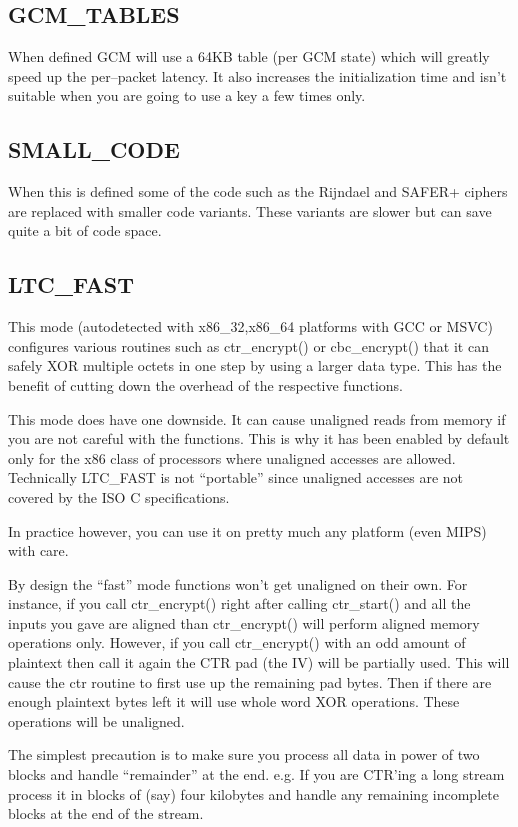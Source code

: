 \documentclass[a4paper]{book}
\begin{document}
\subsection{GCM\_TABLES}
When defined GCM will use a 64KB table (per GCM state) which will greatly speed up the per--packet latency.  
It also increases the initialization time and isn't suitable when you are going to use a key a few times only.  

\subsection{SMALL\_CODE}
When this is defined some of the code such as the Rijndael and SAFER+ ciphers are replaced with smaller code variants.
These variants are slower but can save quite a bit of code space.

\subsection{LTC\_FAST}
This mode (autodetected with x86\_32,x86\_64 platforms with GCC or MSVC) configures various routines such as ctr\_encrypt() or 
cbc\_encrypt() that it can safely XOR multiple octets in one step by using a larger data type.  This has the benefit of 
cutting down the overhead of the respective functions.  

This mode does have one downside.  It can cause unaligned reads from memory if you are not careful with the functions.  This is why
it has been enabled by default only for the x86 class of processors where unaligned accesses are allowed.  Technically LTC\_FAST
is not ``portable'' since unaligned accesses are not covered by the ISO C specifications.

In practice however, you can use it on pretty much any platform (even MIPS) with care.

By design the ``fast'' mode functions won't get unaligned on their own.  For instance, if you call ctr\_encrypt() right after calling
ctr\_start() and all the inputs you gave are aligned than ctr\_encrypt() will perform aligned memory operations only.  However, if you 
call ctr\_encrypt() with an odd amount of plaintext then call it again the CTR pad (the IV) will be partially used.  This will
cause the ctr routine to first use up the remaining pad bytes.  Then if there are enough plaintext bytes left it will use 
whole word XOR operations.  These operations will be unaligned.

The simplest precaution is to make sure you process all data in power of two blocks and handle ``remainder'' at the end.  e.g. If you are 
CTR'ing a long stream process it in blocks of (say) four kilobytes and handle any remaining incomplete blocks at the end of the stream.  
\end{document}
